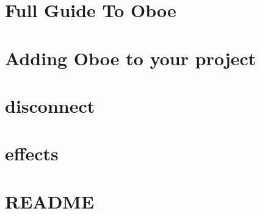 \let\mypdfximage\pdfximage\def\pdfximage{\immediate\mypdfximage}\documentclass[twoside]{book}
\newcommand{\+}{\discretionary{\mbox{\scriptsize$\hookleftarrow$}}{}{}}
\begin{document}
\chapter{Full Guide To Oboe}
\label{md__c_1__users_fab_src__github_branches__neural_amp_modeler_plugin_i_plug2__dependencies__build_6882f8bc2680c82b26e102976c72e1d5}

\chapter{Adding Oboe to your project}
\label{md__c_1__users_fab_src__github_branches__neural_amp_modeler_plugin_i_plug2__dependencies__build_80db26a1527ea789b205c31c9cfcc6db}

\chapter{disconnect}
\label{md__c_1__users_fab_src__github_branches__neural_amp_modeler_plugin_i_plug2__dependencies__build_881511066dd439ce26ea3a433f1c32a2}

\chapter{effects}
\label{md__c_1__users_fab_src__github_branches__neural_amp_modeler_plugin_i_plug2__dependencies__build_00ac400e25ebf1996ffa981ed0371880}

\chapter{R\+E\+A\+D\+ME}
\label{md__c_1__users_fab_src__github_branches__neural_amp_modeler_plugin_i_plug2__dependencies__build_21915788094eac15de34d8d23bf256e5}

\end{document}
